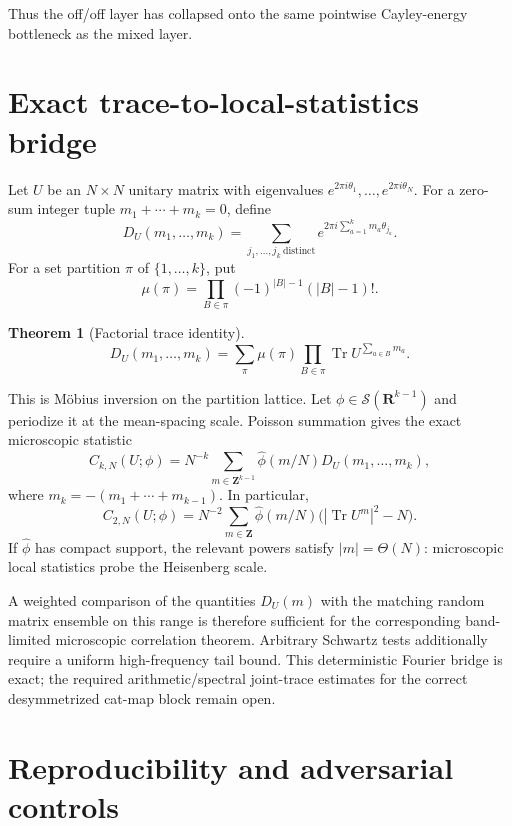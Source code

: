 \documentclass[11pt]{article}
\newtheorem{theorem}{Theorem}[section]
\newcommand{\Z}{\mathbf Z}
\begin{document}
Thus the off/off layer has collapsed onto the same pointwise Cayley-energy
bottleneck as the mixed layer.

\section{Exact trace-to-local-statistics bridge}

Let $U$ be an $N\times N$ unitary matrix with eigenvalues
$e^{2\pi i\theta_1},\ldots,e^{2\pi i\theta_N}$.  For a zero-sum integer tuple
$m_1+\cdots+m_k=0$, define
\[
D_U(m_1,\ldots,m_k)
 =\sum_{j_1,\ldots,j_k\ \mathrm{distinct}}
 e^{2\pi i\sum_{a=1}^km_a\theta_{j_a}}.
\]
For a set partition $\pi$ of $\{1,\ldots,k\}$, put
\[
\mu(\pi)=\prod_{B\in\pi}(-1)^{|B|-1}(|B|-1)!.
\]

\begin{theorem}[Factorial trace identity]\label{thm:factorial}
\begin{equation}\label{eq:factorial}
D_U(m_1,\ldots,m_k)
 =\sum_{\pi}\mu(\pi)
   \prod_{B\in\pi}
   \operatorname{Tr}U^{\sum_{a\in B}m_a}.
\end{equation}
\end{theorem}

This is M\"obius inversion on the partition lattice.  Let
$\phi\in\mathcal S(\mathbf R^{k-1})$ and periodize it at the mean-spacing scale.
Poisson summation gives the exact microscopic statistic
\begin{equation}\label{eq:trace-local}
C_{k,N}(U;\phi)
 =N^{-k}\sum_{m\in\Z^{k-1}}
  \widehat\phi(m/N)D_U(m_1,\ldots,m_k),
\end{equation}
where $m_k=-(m_1+\cdots+m_{k-1})$.  In particular,
\begin{equation}\label{eq:pair-local}
C_{2,N}(U;\phi)
 =N^{-2}\sum_{m\in\Z}\widehat\phi(m/N)
  \bigl(|\operatorname{Tr}U^m|^2-N\bigr).
\end{equation}
If $\widehat\phi$ has compact support, the relevant powers satisfy
$|m|=\Theta(N)$: microscopic local statistics probe the Heisenberg scale.

A weighted comparison of the quantities $D_U(m)$ with the matching random
matrix ensemble on this range is therefore sufficient for the corresponding
band-limited microscopic correlation theorem.  Arbitrary Schwartz tests
additionally require a uniform high-frequency tail bound.  This deterministic
Fourier bridge is exact; the required arithmetic/spectral joint-trace estimates
for the correct desymmetrized cat-map block remain open.

\section{Reproducibility and adversarial controls}
\end{document}
